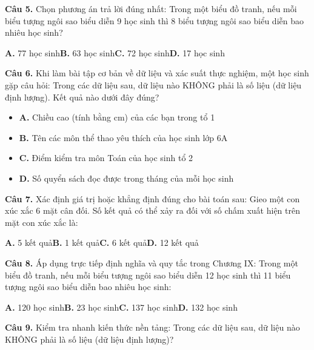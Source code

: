 \documentclass[11pt,a4paper]{article}
\begin{document}
\textbf{\color{primary} Câu 5.} Chọn phương án trả lời đúng nhất: Trong một biểu đồ tranh, nếu mỗi biểu tượng ngôi sao biểu diễn 9 học sinh thì 8 biểu tượng ngôi sao biểu diễn bao nhiêu học sinh?\par
\hspace*{1.5em}\textbf{A.} 77 học sinh\quad\quad \textbf{B.} 63 học sinh\quad\quad \textbf{C.} 72 học sinh\quad\quad \textbf{D.} 17 học sinh\par\vspace{2pt}
\textbf{\color{primary} Câu 6.} Khi làm bài tập cơ bản về dữ liệu và xác suất thực nghiệm, một học sinh gặp câu hỏi: Trong các dữ liệu sau, dữ liệu nào KHÔNG phải là số liệu (dữ liệu định lượng). Kết quả nào dưới đây đúng?\par
\begin{itemize}\setlength{\itemsep}{1pt}\setlength{\parskip}{0pt}
  \item[] \textbf{A.} Chiều cao (tính bằng cm) của các bạn trong tổ 1
  \item[] \textbf{B.} Tên các môn thể thao yêu thích của học sinh lớp 6A
  \item[] \textbf{C.} Điểm kiểm tra môn Toán của học sinh tổ 2
  \item[] \textbf{D.} Số quyển sách đọc được trong tháng của mỗi học sinh
\end{itemize}\vspace{2pt}
\textbf{\color{primary} Câu 7.} Xác định giá trị hoặc khẳng định đúng cho bài toán sau: Gieo một con xúc xắc 6 mặt cân đối. Số kết quả có thể xảy ra đối với số chấm xuất hiện trên mặt con xúc xắc là:\par
\hspace*{1.5em}\textbf{A.} 5 kết quả\quad\quad \textbf{B.} 1 kết quả\quad\quad \textbf{C.} 6 kết quả\quad\quad \textbf{D.} 12 kết quả\par\vspace{2pt}
\textbf{\color{primary} Câu 8.} Áp dụng trực tiếp định nghĩa và quy tắc trong Chương IX: Trong một biểu đồ tranh, nếu mỗi biểu tượng ngôi sao biểu diễn 12 học sinh thì 11 biểu tượng ngôi sao biểu diễn bao nhiêu học sinh:\par
\hspace*{1.5em}\textbf{A.} 120 học sinh\quad\quad \textbf{B.} 23 học sinh\quad\quad \textbf{C.} 137 học sinh\quad\quad \textbf{D.} 132 học sinh\par\vspace{2pt}
\textbf{\color{primary} Câu 9.} Kiểm tra nhanh kiến thức nền tảng: Trong các dữ liệu sau, dữ liệu nào KHÔNG phải là số liệu (dữ liệu định lượng)?\par
\end{document}
